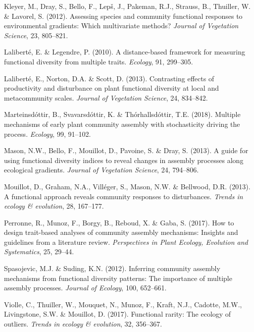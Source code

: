 \documentclass[]{article}
\begin{document}
\hypertarget{ref-kleyer2012methods}{}
Kleyer, M., Dray, S., Bello, F., Lepš, J., Pakeman, R.J., Strauss, B.,
Thuiller, W. \& Lavorel, S. (2012). Assessing species and community
functional responses to environmental gradients: Which multivariate
methods? \emph{Journal of Vegetation Science}, 23, 805--821.

\hypertarget{ref-laliberte2010FDis}{}
Laliberté, E. \& Legendre, P. (2010). A distance-based framework for
measuring functional diversity from multiple traits. \emph{Ecology}, 91,
299--305.

\hypertarget{ref-laliberte2013}{}
Laliberté, E., Norton, D.A. \& Scott, D. (2013). Contrasting effects of
productivity and disturbance on plant functional diversity at local and
metacommunity scales. \emph{Journal of Vegetation Science}, 24,
834--842.

\hypertarget{ref-marteinsdottir2018}{}
Marteinsdóttir, B., Svavarsdóttir, K. \& Thórhallsdóttir, T.E. (2018).
Multiple mechanisms of early plant community assembly with stochasticity
driving the process. \emph{Ecology}, 99, 91--102.

\hypertarget{ref-mason2013}{}
Mason, N.W., Bello, F., Mouillot, D., Pavoine, S. \& Dray, S. (2013). A
guide for using functional diversity indices to reveal changes in
assembly processes along ecological gradients. \emph{Journal of
Vegetation Science}, 24, 794--806.

\hypertarget{ref-mouillot2013indic}{}
Mouillot, D., Graham, N.A., Villéger, S., Mason, N.W. \& Bellwood, D.R.
(2013). A functional approach reveals community responses to
disturbances. \emph{Trends in ecology \& evolution}, 28, 167--177.

\hypertarget{ref-perronne2017}{}
Perronne, R., Munoz, F., Borgy, B., Reboud, X. \& Gaba, S. (2017). How
to design trait-based analyses of community assembly mechanisms:
Insights and guidelines from a literature review. \emph{Perspectives in
Plant Ecology, Evolution and Systematics}, 25, 29--44.

\hypertarget{ref-spasojevic2012}{}
Spasojevic, M.J. \& Suding, K.N. (2012). Inferring community assembly
mechanisms from functional diversity patterns: The importance of
multiple assembly processes. \emph{Journal of Ecology}, 100, 652--661.

\hypertarget{ref-violle2017functional_rarity}{}
Violle, C., Thuiller, W., Mouquet, N., Munoz, F., Kraft, N.J., Cadotte,
M.W., Livingstone, S.W. \& Mouillot, D. (2017). Functional rarity: The
ecology of outliers. \emph{Trends in ecology \& evolution}, 32,
356--367.
\end{document}
